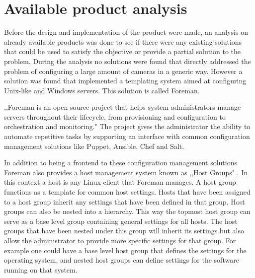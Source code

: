 
\section{Available product analysis}
Before the design and implementation of the product were made, an analysis on already available products was done to see if there were any existing solutions that could be used to satisfy the objective or provide a partial solution to the problem.
During the analysis no solutions were found that directly addressed the problem of configuring a large amount of cameras in a generic way.
However a solution was found that implemented a templating system aimed at configuring Unix-like and Windows servers.
This solution is called Foreman.

,,Foreman is an open source project that helps system administrators manage servers throughout their lifecycle, from provisioning and configuration to orchestration and monitoring." \cite{noauthor_foreman_nodate}
The project gives the administrator the ability to automate repetitive tasks by supporting an interface with common configuration management solutions like Puppet, Ansible, Chef and Salt.

In addition to being a frontend to these configuration management solutions Foreman also provides a host management system known as ,,Host Groups" \cite{noauthor_foreman_nodate-1}. In this context a host is any Linux client that Foreman manages.
A host group functions as a template for common host settings.
Hosts that have been assigned to a host group inherit any settings that have been defined in that group.
Host groups can also be nested into a hierarchy.
This way the topmost host group can serve as a base level group containing general settings for all hosts.
The host groups that have been nested under this group will inherit its settings but also allow the administrator to provide more specific settings for that group.
For example one could have a base level host group that defines the settings for the operating system, and nested host groups can define settings for the software running on that system.

